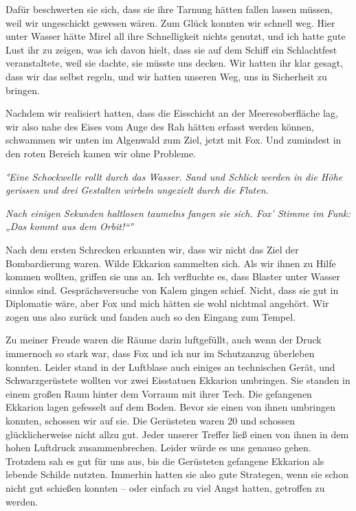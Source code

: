 \documentclass[11pt]{scrartcl}
\begin{document}
Dafür beschwerten sie sich, dass sie ihre Tarnung hätten fallen lassen
müssen, weil wir ungeschickt gewesen wären. Zum Glück konnten wir
schnell weg. Hier unter Wasser hätte Mirel all ihre Schnelligkeit nichts
genutzt, und ich hatte gute Lust ihr zu zeigen, was ich davon hielt,
dass sie auf dem Schiff ein Schlachtfest veranstaltete, weil sie dachte,
sie müsste uns decken. Wir hatten ihr klar gesagt, dass wir das selbst
regeln, und wir hatten unseren Weg, uns in Sicherheit zu bringen.

Nachdem wir realisiert hatten, dass die Eisschicht an der
Meeresoberfläche lag, wir also nahe des Eises vom Auge des Rah hätten
erfasst werden können, schwammen wir unten im Algenwald zum Ziel, jetzt
mit Fox. Und zumindest in den roten Bereich kamen wir ohne Probleme.

\emph{°Eine Schockwelle rollt durch das Wasser. Sand und Schlick werden
in die Höhe gerissen und drei Gestalten wirbeln ungezielt durch die
Fluten.}

\emph{Nach einigen Sekunden haltlosen taumelns fangen sie sich. Fox'
Stimme im Funk: „Das kommt aus dem Orbit!``°}

Nach dem ersten Schrecken erkannten wir, dass wir nicht das Ziel der
Bombardierung waren. Wilde Ekkarion sammelten sich. Als wir ihnen zu
Hilfe kommen wollten, griffen sie uns an. Ich verfluchte es, dass
Blaster unter Wasser sinnlos sind. Gesprächsversuche von Kalem gingen
schief. Nicht, dass sie gut in Diplomatie wäre, aber Fox und mich hätten
sie wohl nichtmal angehört. Wir zogen uns also zurück und fanden auch so
den Eingang zum Tempel.

Zu meiner Freude waren die Räume darin luftgefüllt, auch wenn der Druck
immernoch so stark war, dass Fox und ich nur im Schutzanzug überleben
konnten. Leider stand in der Luftblase auch einiges an technischen
Gerät, und Schwarzgerüstete wollten vor zwei Eisstatuen Ekkarion
umbringen. Sie standen in einem großen Raum hinter dem Vorraum mit ihrer
Tech. Die gefangenen Ekkarion lagen gefesselt auf dem Boden. Bevor sie
einen von ihnen umbringen konnten, schossen wir auf sie. Die Gerüsteten
waren 20 und schossen glücklicherweise nicht allzu gut. Jeder unserer
Treffer ließ einen von ihnen in dem hohen Luftdruck zusammenbrechen.
Leider würde es uns genauso gehen. Trotzdem sah es gut für uns aus, bis
die Gerüsteten gefangene Ekkarion als lebende Schilde nutzten. Immerhin
hatten sie also gute Strategen, wenn sie schon nicht gut schießen
konnten -- oder einfach zu viel Angst hatten, getroffen zu werden.
\end{document}
